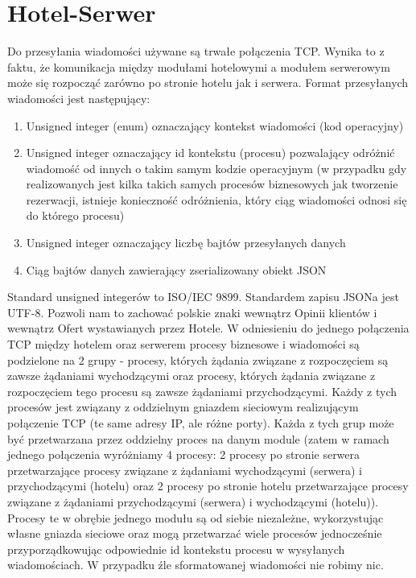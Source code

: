 \documentclass{article}
\begin{document}
\section{Hotel-Serwer}
Do przesyłania wiadomości używane są trwałe połączenia TCP. Wynika to z faktu, że komunikacja między modułami hotelowymi a modułem serwerowym może się rozpocząć zarówno po stronie hotelu jak i serwera. Format przesyłanych wiadomości jest następujący:
\begin{enumerate}
    \item Unsigned integer (enum) oznaczający kontekst wiadomości (kod operacyjny)
    \item Unsigned integer oznaczający id kontekstu (procesu) pozwalający odróżnić wiadomość od innych o takim samym kodzie operacyjnym (w przypadku gdy realizowanych jest kilka takich samych procesów biznesowych jak tworzenie rezerwacji, istnieje konieczność odróżnienia, który ciąg wiadomości odnosi się do którego procesu)
    \item Unsigned integer oznaczający liczbę bajtów przesyłanych danych
    \item Ciąg bajtów danych zawierający zserializowany obiekt JSON
\end{enumerate}
Standard unsigned integerów to ISO/IEC 9899. Standardem zapisu JSONa jest UTF-8. Pozwoli nam to zachować polskie znaki wewnątrz Opinii klientów i wewnątrz Ofert wystawianych przez Hotele.
W odniesieniu do jednego połączenia TCP między hotelem oraz serwerem procesy biznesowe i wiadomości są podzielone na 2 grupy - procesy, których żądania związane z rozpoczęciem są zawsze żądaniami wychodzącymi oraz procesy, których żądania związane z rozpoczęciem tego procesu są zawsze żądaniami przychodzącymi. Każdy z tych procesów jest związany z oddzielnym gniazdem sieciowym realizującym połączenie TCP (te same adresy IP, ale różne porty). Każda z tych grup może być przetwarzana przez oddzielny proces na danym module (zatem w ramach jednego połączenia wyróżniamy 4 procesy: 2 procesy po stronie serwera przetwarzające procesy związane z żądaniami wychodzącymi (serwera) i przychodzącymi (hotelu) oraz 2 procesy po stronie hotelu przetwarzające procesy związane z żądaniami przychodzącymi (serwera) i wychodzącymi (hotelu)). Procesy te w obrębie jednego modułu są od siebie niezależne, wykorzystując własne gniazda sieciowe oraz mogą przetwarzać wiele procesów jednocześnie przyporzą\-dkowując odpowiednie id kontekstu procesu w wysyłanych wiadomościach.
W przypadku źle sformatowanej wiadomości nie robimy nic.
\end{document}
